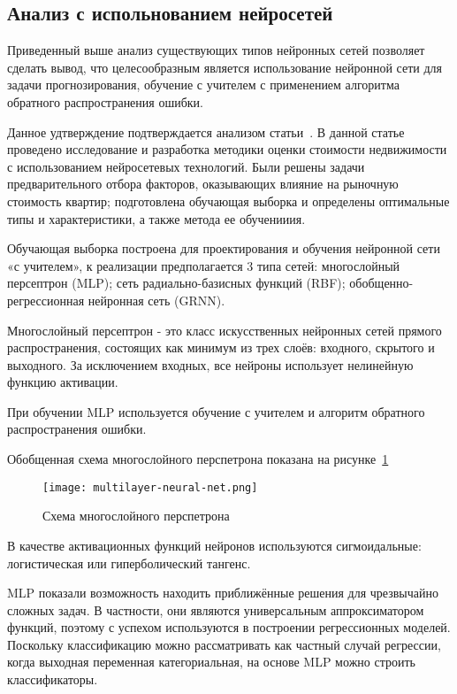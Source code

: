 \subsection{Анализ с испольнованием нейросетей}
\label{sec:analogues:neural}

Приведенный выше анализ существующих типов нейронных сетей позволяет сделать вывод, что целесообразным является
использование нейронной сети для задачи прогнозирования, обучение с учителем с применением алгоритма обратного
распространения ошибки.

Данное удтверждение подтверждается анализом статьи~\cite{using_neural_engines}. В данной статье проведено
исследование и разработка методики оценки стоимости \linebreak недвижимости с использованием нейросетевых технологий. Были решены
задачи предварительного отбора факторов, оказывающих влияние на рыночную стоимость квартир; подготовлена обучающая выборка
и определены оптимальные типы и характеристики, а также метода ее обученииия.

Обучающая выборка построена для проектирования и обучения нейронной сети «с учителем», к реализации
предполагается 3 типа сетей: многослойный персептрон (MLP); сеть радиально-базисных функций (RBF);\linebreak
обобщенно-регрессионная нейронная сеть (GRNN).

Многослойный персептрон - это класс искусственных нейронных сетей прямого распространения, состоящих как минимум из
трех слоёв: входного, скрытого и выходного. За исключением входных, все нейроны использует нелинейную функцию активации.

При обучении MLP используется обучение с учителем и алгоритм обратного распространения ошибки.

Обобщенная схема многослойного перспетрона показана на \linebreak рисунке~\ref{fig:analogues:multilayer-neural-net}

\begin{figure}[!ht]
  \centering
  \texttt{[image: multilayer-neural-net.png]} 
  \caption{Схема многослойного перспетрона}
  \label{fig:analogues:multilayer-neural-net}
\end{figure}

В качестве активационных функций нейронов используются сигмоидальные: логистическая или гиперболический тангенс.

MLP показали возможность находить приближённые решения для чрезвычайно сложных задач. В частности, они являются
универсальным аппроксиматором функций, поэтому с успехом используются в построении регрессионных моделей.
Поскольку классификацию можно рассматривать как частный случай регрессии, когда выходная переменная категориальная,
на основе MLP можно строить классификаторы.

